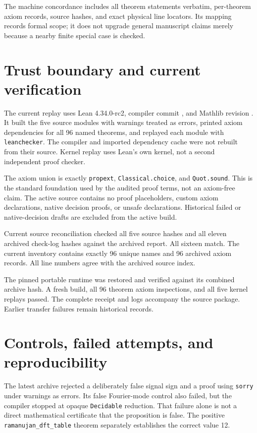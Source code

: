 The machine concordance includes all theorem statements verbatim, per-theorem
axiom records, source hashes, and exact physical line locators. Its mapping
records formal scope; it does not upgrade general manuscript claims merely
because a nearby finite special case is checked.

\section{Trust boundary and current verification}
The current replay uses Lean 4.34.0-rc2, compiler commit
\texttt{}, and Mathlib revision
\texttt{}.
It built the five source modules with warnings treated as errors, printed axiom
dependencies for all 96 named theorems, and replayed each module with
\texttt{leanchecker}. The compiler and imported dependency cache were not rebuilt
from their source. Kernel replay uses Lean's own kernel, not a second independent
proof checker.

The axiom union is exactly \texttt{propext}, \texttt{Classical.choice}, and
\texttt{Quot.sound}. This is the standard foundation used by the audited proof
terms, not an axiom-free claim. The active source contains no proof placeholders,
custom axiom declarations, native decision proofs, or unsafe declarations.
Historical failed or native-decision drafts are excluded from the active build.

Current source reconciliation checked all five source hashes and all eleven
archived check-log hashes against the archived report. All sixteen match.
The current inventory contains exactly 96 unique names and 96 archived axiom
records. All line numbers agree with the archived source index.

The pinned portable runtime was restored and verified against its combined archive hash. A fresh build, all 96 theorem axiom inspections, and all five kernel replays passed. The complete receipt and logs accompany the source package. Earlier transfer failures remain historical records.

\section{Controls, failed attempts, and reproducibility}
The latest archive rejected a deliberately false signal sign and a proof using
\texttt{sorry} under warnings as errors. Its false Fourier-mode control also
failed, but the compiler stopped at opaque \texttt{Decidable} reduction. That
failure alone is not a direct mathematical certificate that the proposition is
false. The positive \texttt{ramanujan\_dft\_table} theorem separately establishes
the correct value 12.

